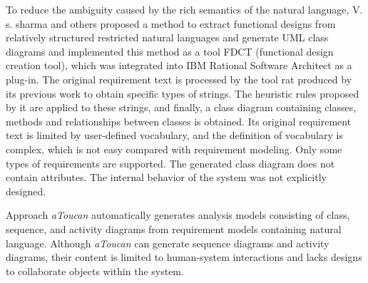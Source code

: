 \documentclass[pdflatex,sn-mathphys-num]{sn-jnl}%
\theoremstyle{thmstyleone}%
\theoremstyle{thmstyletwo}%
\theoremstyle{thmstylethree}%
\begin{document}
To reduce the ambiguity caused by the rich semantics of the natural language, V. s. sharma\cite{FDCT} and others proposed a method to extract functional designs from relatively structured restricted natural languages and generate UML class diagrams and implemented this method as a tool FDCT (functional design creation tool), which was integrated into IBM Rational Software Architect as a plug-in. The original requirement text is processed by the tool rat produced by its previous work to obtain specific types of strings. The heuristic rules proposed by it are applied to these strings, and finally, a class diagram containing classes, methods and relationships between classes is obtained. Its original requirement text is limited by user-defined vocabulary, and the definition of vocabulary is complex, which is not easy compared with requirement modeling. Only some types of requirements are supported. The generated class diagram does not contain attributes. The internal behavior of the system was not explicitly designed.

Approach \textit{aToucan}\cite{aToucan} automatically generates analysis models consisting of class, sequence, and activity diagrams from requirement models containing natural language. Although \textit{aToucan} can generate sequence diagrams and activity diagrams, their content is limited to human-system interactions and lacks designs to collaborate objects within the system. 
\end{document}
